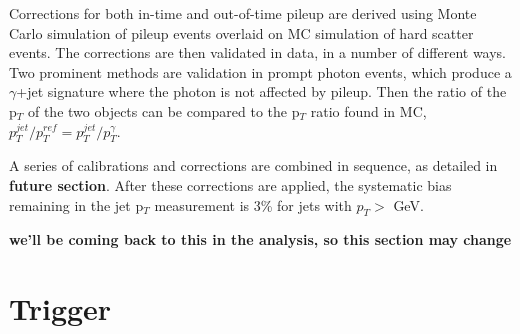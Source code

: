 \documentclass[11pt]{article}
\begin{document}
Corrections for both in-time and out-of-time pileup are derived using Monte Carlo simulation of pileup events overlaid on MC simulation of hard scatter events.  The corrections are then validated in data, in a number of different ways.  Two prominent methods are validation in prompt photon events, which produce a $\gamma$+jet signature where the photon is not affected by pileup.  Then the ratio of the p$_T$ of the two objects can be compared to the p$_T$ ratio found in MC, $p^{jet}_T/p^{ref}_T = p^{jet}_T/p^{\gamma}_T$.

A series of calibrations and corrections are combined in sequence, as detailed in \textbf{future section}.  After these corrections are applied, the systematic bias remaining in the jet p$_T$ measurement is 3\% for jets with $p_T>$ GeV.

\textbf{we'll be coming back to this in the analysis, so this section may change}


\section{Trigger}
\end{document}
